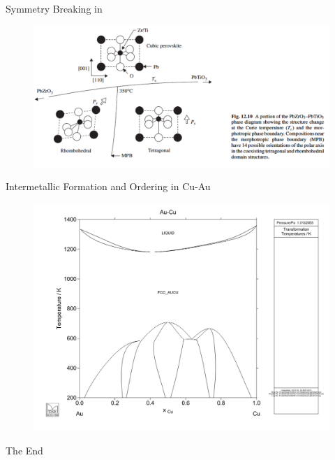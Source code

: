 \documentclass[aspectratio=169]{beamer}
\begin{document}
    \begin{frame}{Symmetry Breaking in }

        \begin{figure}
            \centering
            \includegraphics[width=\linewidth]{lectures/figures/Lab_3-PbTiO3.png}
        \end{figure}
    \end{frame}

    \begin{frame}{Intermetallic Formation and Ordering in Cu-Au}
        \begin{figure}
            \centering
            \includegraphics[width=0.6\linewidth]{lectures/figures/Lab_3-Cu_Au_PD.png}
        \end{figure}
    \end{frame}

%     
%     

    \begin{frame}
        \Huge{\centerline{The End}}
    \end{frame}
\end{document}
